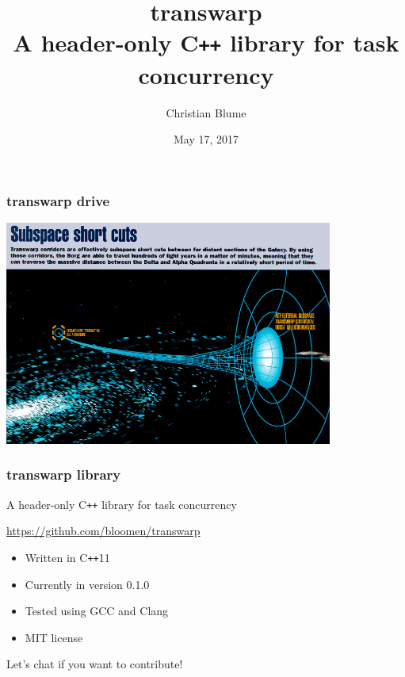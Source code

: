 \documentclass[11pt]{beamer}
\begin{document}
\title{transwarp \\ \vspace{0.2cm} \large A header-only C\texttt{++} library for task concurrency}  
\author{Christian Blume}
\date{May 17, 2017} 

\begin{frame}
\titlepage
\end{frame}


\begin{frame}[fragile]
\frametitle{transwarp drive}
\includegraphics[width=10.8cm]{img/transwarp_conduit.jpg}
\end{frame}


\begin{frame}[fragile]
\frametitle{transwarp library}

A header-only C\texttt{++} library for task concurrency

\bigskip

\url{https://github.com/bloomen/transwarp}

\bigskip
\bigskip

\begin{itemize}
\itemsep 1em
\item Written in C\texttt{++}11 
\item Currently in version 0.1.0
\item Tested using GCC and Clang
\item MIT license
\end{itemize}

\bigskip
\bigskip

Let's chat if you want to contribute!

\end{frame}
\end{document}
